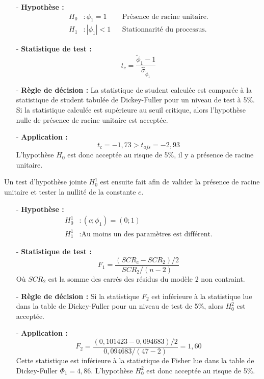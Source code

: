 \begin{itemize}
\item[-]\textbf{ Hypothèse :} 
\begin{align*}
        H_{0} &: \phi_{1} = 1  & &\text{Présence de racine unitaire.}\\
        H_{1} &:|\phi_{1}| < 1   &  &\text{Stationnarité du processus.}
\end{align*}
\item[-]\textbf{Statistique de test :} 
\begin{equation*}
    t_{c} = \frac{\tilde{\phi}_{1}- 1}{\hat{\sigma}_{\tilde{\phi}_{1}}}
\end{equation*}
\item[-]\textbf{Règle de décision :} La statistique de student calculée est comparée à la statistique de student tabulée de Dickey-Fuller pour un niveau de test à 
5\%. Si la statistique calculée est supérieure au seuil critique, alors l'hypothèse nulle de présence de racine unitaire est acceptée.
\item[-]\textbf{Application :} 
\begin{equation*}
    t_{c} = -1,73 > t_{ajs} = -2,93
\end{equation*}
L'hypothèse $H_{0}$ est donc acceptée au risque de 5\%, il y a présence de racine unitaire.
\end{itemize}
%
Un test d'hypothèse jointe $H_{0}^{1}$ est ensuite fait afin de valider la présence de racine unitaire et tester la nullité de la constante $c$.
\begin{itemize}
\item[-]\textbf{Hypothèse :} 
\begin{equation*}
    \begin{split}
        H_{0}^{1} &: (c; \phi_{1}) = (0;1)\\
        H_{1}^{1} &: \text{Au moins un des paramètres est différent.}
    \end{split}
\end{equation*}
\item[-]\textbf{Statistique de test :}
\begin{equation*}
    F_{1} = \frac{(SCR_{c} - SCR_{2})/2}{SCR_{2}/(n-2)}
\end{equation*}
Où $SCR_{2}$ est la somme des carrés des résidus du modèle 2 non contraint.
\item[-]\textbf{Règle de décision :}  Si la statistique $F_{2}$ est inférieure à la statistique lue dans la table de Dickey-Fuller pour un niveau de test de 5\%, alors 
$H_{0}^{2}$ est acceptée.
\item[-]\textbf{Application :} 
\begin{equation*}
    F_{2} = \frac{(0,101423 - 0,094683)/2}{0,094683/(47-2)} = 1,60
\end{equation*}
Cette statistique est inférieure à la statistique de Fisher lue dans la table de Dickey-Fuller $\Phi_{1} = 4,86$. L'hypothèse $H_{0}^{2}$ est donc acceptée au risque 
de 5\%. 
\end{itemize}
